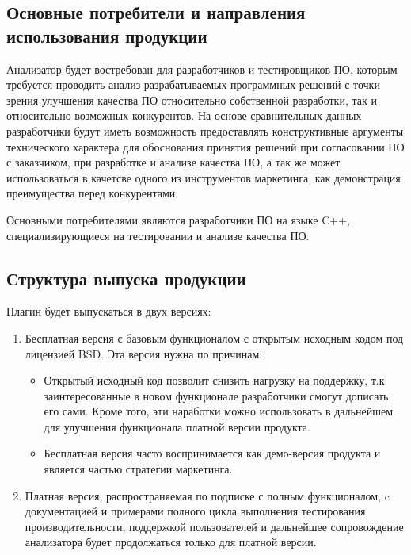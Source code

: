 \subsection{Основные потребители и направления использования продукции}
	Анализатор будет востребован для разработчиков и тестировщиков ПО, которым требуется проводить анализ разрабатываемых программных решений с точки зрения улучшения качества ПО относительно собственной разработки, так и относительно возможных конкурентов. На основе сравнительных данных разработчики будут иметь возможность предоставлять конструктивные аргументы технического характера для обоснования принятия решений при согласовании ПО с заказчиком, при разработке и анализе качества ПО, а так же может использоваться в качетсве одного из инструментов маркетинга, как демонстрация преимущества перед конкурентами.
	
	Основными потребителями являются разработчики ПО на языке C++, специализирующиеся на тестировании и анализе качества ПО.

\subsection{Структура выпуска продукции}
	Плагин будет выпускаться в двух версиях:
	\begin{enumerate}[noitemsep]
		\item 
			Бесплатная версия с базовым функционалом с открытым исходным кодом под лицензией BSD. Эта версия нужна по причинам:
			\begin{itemize}[noitemsep]
				\item Открытый исходный код позволит снизить нагрузку на поддержку, т.к. заинтересованные в новом функционале разработчики смогут дописать его сами. Кроме того, эти наработки можно использовать в дальнейшем для улучшения функционала платной версии продукта.
				\item Бесплатная версия часто воспринимается как демо-версия продукта и является частью стратегии маркетинга.
			\end{itemize}
		\item Платная версия, распространяемая по подписке с полным функционалом, c документацией и примерами полного цикла выполнения тестирования производительности, поддержкой пользователей и дальнейшее сопровождение анализатора будет продолжаться только для платной версии.
	\end{enumerate}
